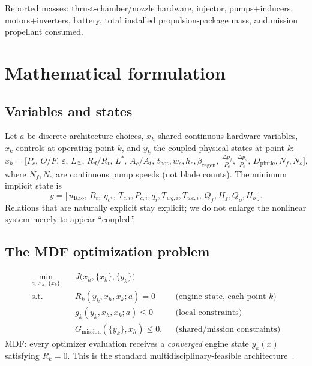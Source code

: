 \documentclass[11pt]{article}
\newcommand{\Rt}{R_t}
\newcommand{\cstar}{c^{*}}
\begin{document}
\noindent Reported masses: thrust-chamber/nozzle hardware, injector, pumps$+$inducers,
motors$+$inverters, battery, total installed propulsion-package mass, and mission
propellant consumed.

\section{Mathematical formulation}
\label{sec:math}

\subsection{Variables and states}
Let $a$ be discrete architecture choices, $x_h$ shared continuous hardware
variables, $x_k$ controls at operating point $k$, and $y_k$ the coupled physical
states at point $k$:
\begin{equation}
x_h=\big[P_c,\,O/F,\,\varepsilon,\,L_\%,\,R_d/\Rt,\,L^{*},\,A_c/A_t,\,
t_\mathrm{hot},w_c,h_c,\beta_\mathrm{regen},\,\tfrac{\Delta p_f}{P_c},\tfrac{\Delta p_o}{P_c},\,
D_\mathrm{pintle},N_f,N_o\big],
\end{equation}
where $N_f,N_o$ are continuous pump speeds (not blade counts). The minimum
implicit state is
\begin{equation}
y=\big[\,u_\mathrm{Rao},\,\Rt,\,\eta_{\cstar},\,T_{c,i},P_{c,i},q_i,T_{wg,i},T_{wc,i},\,
Q_f,H_f,Q_o,H_o\,\big].
\end{equation}
Relations that are naturally explicit stay explicit; we do not enlarge the
nonlinear system merely to appear ``coupled.''

\subsection{The MDF optimization problem}
\begin{equation}
\begin{aligned}
\min_{a,\,x_h,\,\{x_k\}}\quad & J\big(x_h,\{x_k\},\{y_k\}\big)\\
\text{s.t.}\quad
& R_k(y_k,x_h,x_k;a)=0 && \text{(engine state, each point $k$)}\\
& g_k(y_k,x_h,x_k;a)\le 0 && \text{(local constraints)}\\
& G_\mathrm{mission}(\{y_k\},x_h)\le 0. && \text{(shared/mission constraints)}
\end{aligned}
\label{eq:mdf}
\end{equation}
MDF: every optimizer evaluation receives a \emph{converged} engine state
$y_k(x)$ satisfying $R_k=0$. This is the standard multidisciplinary-feasible
architecture~\cite{martinsLambe2013,martinsNing2021}.
\end{document}
